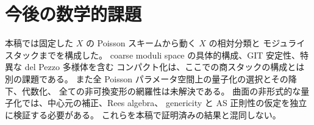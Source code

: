 \documentclass[a4paper,11pt]{ltjsarticle}
\numberwithin{equation}{section}
\theoremstyle{plain}
\theoremstyle{definition}
\begin{document}


\section{今後の数学的課題}
\label{sec:open}
本稿では固定した $X$ の Poisson スキームから動く $X$ の相対分類と
モジュライスタックまでを構成した。
coarse moduli space の具体的構成、GIT 安定性、特異な del Pezzo 多様体を含む
コンパクト化は、ここでの商スタックの構成とは別の課題である。
また全 Poisson パラメータ空間上の量子化の選択とその降下、代数化、
全ての非可換変形の網羅性は未解決である。
曲面の非形式的な量子化では、中心元の補正、Rees algebra、
genericity と AS 正則性の仮定を独立に検証する必要がある。
これらを本稿で証明済みの結果と混同しない。

\begingroup
\small


\endgroup
\end{document}
